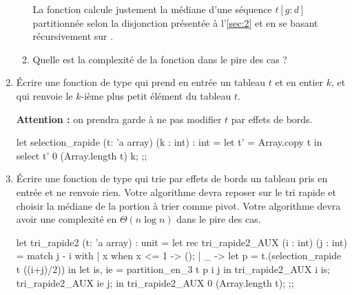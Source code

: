 \documentclass[a4paper,french,bookmarks]{article}
\begin{document}
\begin{enumerate}
\begin{enumerate}
{            La fonction  calcule justement la médiane d'une séquence $t[g : d]$ partitionnée selon la disjonction présentée à l'\ref{sec:2} et en se basant récursivement sur .
        }
        
        \item Quelle est la complexité de la fonction  dans le pire des cas ?
        
    \end{enumerate}
    
    \item Écrire une fonction  de type  qui prend en entrée un tableau $t$ et en entier $k$, et qui renvoie le $k$-ième plus petit élément du tableau $t$.
    
    \textbf{Attention :} on prendra garde à ne pas modifier $t$ par effets de bords.
    
    \begin{ocaml}
let selection_rapide (t: 'a array) (k : int) : int =
    let t' = Array.copy t in select t' 0 (Array.length t) k;
;;
    \end{ocaml}
    
    \item Écrire une fonction  de type  qui trie par effets de bords un tableau pris en entrée et ne renvoie rien. Votre algorithme devra reposer sur le tri rapide et choisir la médiane de la portion à trier comme pivot. Votre algorithme devra avoir une complexité en $\Theta(n \log n)$ dans le pire des cas.
    
    \begin{ocaml}
let tri_rapide2 (t: 'a array) : unit =
    let rec tri_rapide2_AUX (i : int) (j : int) = match j - i with
        | x when x <= 1 -> ();
        | _ -> let p = t.(selection_rapide t ((i+j)/2)) in
            let is, ie = partition_en_3 t p i j in
            tri_rapide2_AUX i is;
            tri_rapide2_AUX ie j;
    in tri_rapide2_AUX 0 (Array.length t);
;;
    \end{ocaml}

\end{enumerate}
\end{document}
